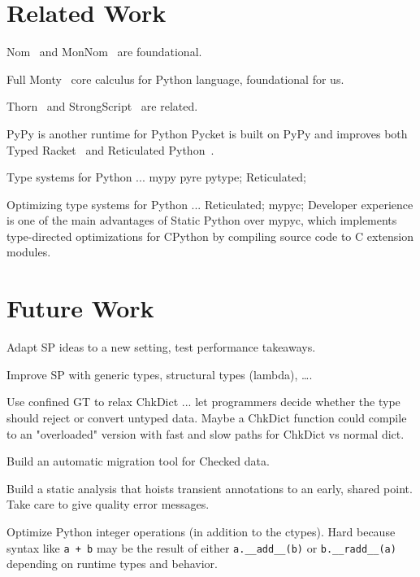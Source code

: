 \documentclass[english,cleveref,submission]{programming}
\newcommand{\SP}{Static Python}
\newcommand{\code}[1]{\texttt{#1}}
\begin{document}
\section{Related Work}
\label{s:related}

Nom~\cite{mt-oopsla-2017} and MonNom~\cite{mt-oopsla-2021} are foundational.

Full Monty~\cite{pmmwplck-oopsla-2013} core calculus for Python language, foundational for us.

Thorn~\cite{wnlov-popl-2010} and StrongScript~\cite{rzv-ecoop-2015} are related.

PyPy is another runtime for Python
Pycket is built on PyPy and improves both Typed Racket~\cite{bbst-oopsla-2017}
and Reticulated Python~\cite{vsc-dls-2019}.

Type systems for Python ...
mypy pyre pytype;
Reticulated;

Optimizing type systems for Python ...
Reticulated;
mypyc;
Developer experience is one of the main advantages of \SP{} over mypyc,
which implements type-directed optimizations for CPython
by compiling source code to C extension modules.



\section{Future Work}
\label{s:future}



Adapt SP ideas to a new setting, test performance takeaways.

Improve SP with generic types, structural types (lambda), \ldots.

Use confined GT to relax ChkDict ... let programmers decide whether
the type should reject or convert untyped data.
Maybe a ChkDict function could compile to an "overloaded" version with
fast and slow paths for ChkDict vs normal dict.

Build an automatic migration tool for Checked data.

Build a static analysis that hoists transient annotations to an early, shared point.
Take care to give quality error messages.

Optimize Python integer operations (in addition to the ctypes).
Hard because syntax like \code{a + b} may be the result of either \code{a.\_\_add\_\_(b)}
or \code{b.\_\_radd\_\_(a)} depending on runtime types and behavior.
\end{document}
